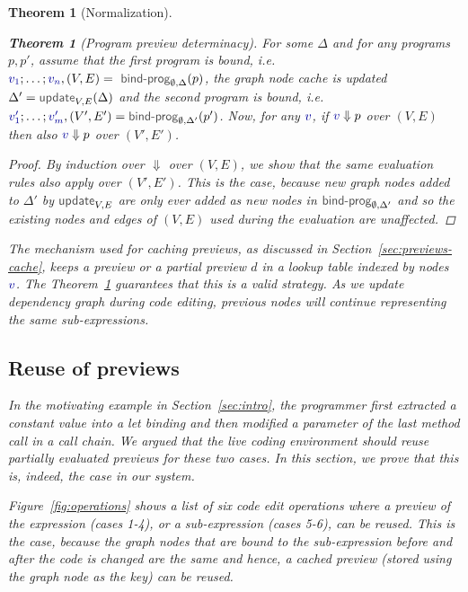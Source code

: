 \documentclass[acmsmall,anonymous,fleqn]{acmart}\settopmatter{printfolios=false,printccs=false,printacmref=false}
\newcounter{thc}
\theoremstyle{plain}
\newtheorem{theorem}[thc]{Theorem}
\theoremstyle{definition}
\newcommand{\ident}[1]{\textnormal{\textcolor{idclr}{\sffamily #1}}}
\newcommand{\bndclr}[1]{\textcolor{kvdclr}{#1}}
\begin{document}
\begin{theorem}[Normalization]
\begin{theorem}[Program preview determinacy]
\label{thm:determinacy}
For some $\Delta$ and for any programs $p, p'$, assume that the first program is bound,
i.e.~$\bndclr{v_1};\ldots;\bndclr{v_n}, (V, E) = \ident{bind-prog}_{\emptyset, \Delta}(p)$,
the graph node cache is updated $\Delta' = \ident{update}_{V, E}(\Delta)$ and the second program is
bound, i.e.~$\bndclr{v'_1};\ldots;\bndclr{v'_m}, (V', E') = \ident{bind-prog}_{\emptyset, \Delta'}(p')$.
Now, for any $\bndclr{v}$, if $\bndclr{v} \Downarrow p$ over $(V, E)$ then also
 $\bndclr{v} \Downarrow p$ over $(V', E')$.
\end{theorem}
\begin{proof}
By induction over $\Downarrow$ over $(V, E)$, we show that the same evaluation rules also
apply over $(V', E')$.
This is the case, because new graph nodes added to $\Delta'$ by $\ident{update}_{V, E}$
are only ever added as new nodes in $\ident{bind-prog}_{\emptyset, \Delta'}$ and so the existing
nodes and edges of $(V, E)$ used during the evaluation are unaffected.
\end{proof}

The mechanism used for caching previews, as discussed in Section~\ref{sec:previews-cache},
keeps a preview or a partial preview $d$ in a lookup table indexed by nodes $\bndclr{v}$. The
Theorem~\ref{thm:determinacy} guarantees that this is a valid strategy. As we update dependency
graph during code editing, previous nodes will continue representing the same sub-expressions.


\subsection{Reuse of previews}
\label{sec:properties-reuse}

In the motivating example in Section~\ref{sec:intro}, the programmer first extracted a constant
value into a let binding and then modified a parameter of the last method call in a call chain.
We argued that the live coding environment should reuse partially evaluated previews for these
two cases. In this section, we prove that this is, indeed, the case in our system.

Figure~\ref{fig:operations} shows a list of six code edit operations where a preview of the
expression (cases 1-4), or a sub-expression (cases 5-6), can be reused. This is the case, because
the graph nodes that are bound to the sub-expression before and after the code is changed are the
same and hence, a cached preview (stored using the graph node as the key) can be reused.


\end{theorem}
\end{document}
